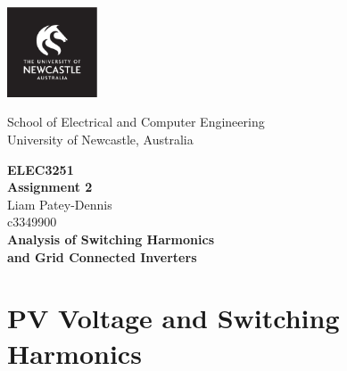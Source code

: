 \documentclass[12pt,twoside]{scrartcl}
\begin{document}
\setcounter{page}{1}
\begin{titlepage}
    \begin{center}

        \includegraphics[width=0.2\textwidth]{LOGO_Square.pdf}

        \vspace*{0.4cm}
        School of Electrical and Computer Engineering \\
        University of Newcastle, Australia
        
        \vspace{1cm}
        \huge
        \textbf{\textsf{ELEC3251 \\ }}
        \vspace{0.2cm}
        \huge
        \textbf{\textsf{Assignment 2 \\ }}
        \vspace{1cm}
        \normalsize
        Liam Patey-Dennis \\
        c3349900 \\
        \vspace{2.5cm}
        \large
        \textbf{\textsf{Analysis of Switching Harmonics \\ 
                        and Grid Connected Inverters
                        }}

        
        \vfill    
    \end{center}
\end{titlepage}


\section{PV Voltage and Switching Harmonics}
\end{document}
